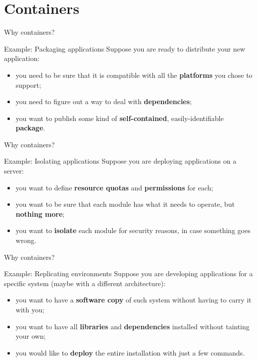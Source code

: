 
\section{Containers}
\graphicspath{{figs/section4/}}

\begin{frame}{Why containers?}
	\begin{exampleblock}{Example: Packaging applications}
		Suppose you are ready to distribute your new application:
		\begin{itemize}
			\item you need to be sure that it is compatible with all the \textbf{platforms} you chose to support;
			\item you need to figure out a way to deal with \textbf{dependencies};
			\item you want to publish some kind of \textbf{self-contained}, easily-identifiable \textbf{package}.
		\end{itemize}
	\end{exampleblock}
\end{frame}
\begin{frame}{Why containers?}
	\begin{exampleblock}{Example: Isolating applications}
		Suppose you are deploying applications on a server:
		\begin{itemize}
			\item you want to define \textbf{resource quotas} and \textbf{permissions} for each;
			\item you want to be sure that each module has what it needs to operate, but \textbf{nothing more};
			\item you want to \textbf{isolate} each module for security reasons, in case something goes wrong.
		\end{itemize}
	\end{exampleblock}
\end{frame}
\begin{frame}{Why containers?}
	\begin{exampleblock}{Example: Replicating environments}
		Suppose you are developing applications for a specific system (maybe with a different architecture):
		\begin{itemize}
			\item you want to have a \textbf{software copy} of such system without having to carry it with you;
			\item you want to have all \textbf{libraries} and \textbf{dependencies} installed without tainting your own;
			\item you would like to \textbf{deploy} the entire installation with just a few commands.
		\end{itemize}
	\end{exampleblock}
\end{frame}
